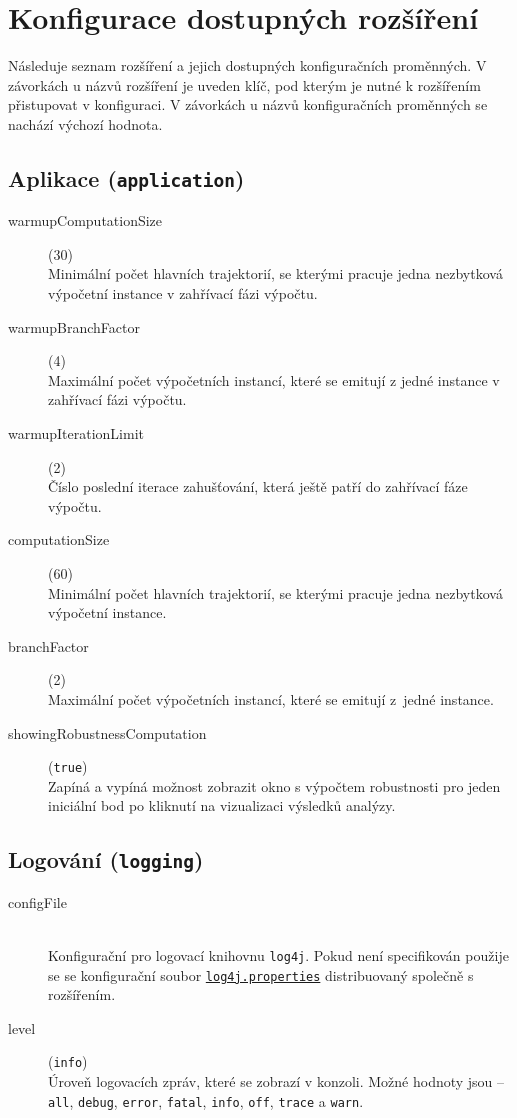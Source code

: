 \chapter{Konfigurace dostupných rozšíření}\label{appendix:extensions}

Následuje seznam rozšíření a jejich dostupných konfiguračních proměnných. V závorkách
u názvů rozšíření je uveden klíč, pod kterým je nutné k roz\-ší\-ře\-ním přistupovat v konfiguraci.
V závorkách u názvů konfiguračních proměnných se nachází výchozí hodnota.

\section{Aplikace (\texttt{application})}

\begin{description}
	\item[warmupComputationSize] (30) \\
		Minimální počet hlavních trajektorií, se kterými pracuje jedna nezbytková výpočetní instance v zahřívací fázi výpočtu.
	\item[warmupBranchFactor] (4) \\
		Maximální počet výpočetních instancí, které se emitují z jedné instance v zahřívací fázi výpočtu.
	\item[warmupIterationLimit] (2) \\
		Číslo poslední iterace zahušťování, která ještě patří do zahřívací fáze výpočtu.
	\item[computationSize] (60) \\
		Minimální počet hlavních trajektorií, se kterými pracuje jedna nezbytková výpočetní instance.
	\item[branchFactor] (2) \\
		Maximální počet výpočetních instancí, které se emitují z~jedné instance.
	\item[showingRobustnessComputation] (\texttt{true}) \\
		Zapíná a vypíná možnost zobrazit okno s výpočtem robustnosti pro jeden iniciální bod po kliknutí na vizualizaci výsledků analýzy.
\end{description}

\section{Logování (\texttt{logging})}

\begin{description}
	\item[configFile] ~\\
		Konfigurační pro logovací knihovnu \texttt{log4j}. Pokud není specifikován použije se se konfigurační soubor \href{https://github.com/sybila/parasim/blob/2.0.0.Final/core/src/main/resources/org/sybila/parasim/log4j/log4j.properties}{\texttt{log4j.properties}} distribuovaný společně s rozšířením.
	\item[level] (\texttt{info}) \\
		Úroveň logovacích zpráv, které se zobrazí v konzoli. Možné hodnoty jsou -- \texttt{all}, \texttt{debug}, \texttt{error}, \texttt{fatal}, \texttt{info}, \texttt{off}, \texttt{trace} a \texttt{warn}.
\end{description}


